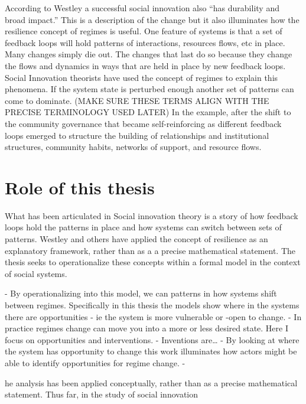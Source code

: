 According to Westley a successful social innovation also “has durability and broad impact.” This is a description of the change but it also illuminates how the resilience concept of regimes is useful. One feature of systems is that a set of feedback loops will hold patterns of interactions, resources flows, etc in place. Many changes simply die out.  The changes that last do so because they change the flows and dynamics in ways that are held in place by new feedback loops.  Social Innovation theorists have used the concept of regimes to explain this phenomena. If the system state is perturbed enough another set of patterns can come to dominate.  (MAKE SURE THESE TERMS ALIGN WITH THE PRECISE TERMINOLOGY USED LATER) In the example, after the shift to the community governance that became self-reinforcing as different feedback loops emerged to structure the building of relationships and institutional structures, community habits, networks of support, and resource flows. 

\section{Role of this thesis}

What has been articulated in Social innovation theory is a story of how feedback loops hold the patterns in place  and how systems can switch between sets of patterns. Westley and others have applied the concept of resilience as an explanatory framework, rather than as a a precise mathematical statement. 
The thesis seeks to operationalize these concepts within a formal model in the context of social systems. 


- By operationalizing into this model, we can patterns in how systems shift between regimes. Specifically in this thesis the models show where in the systems there are opportunities - ie the system is more vulnerable or -open to change. 
- In practice regimes change can move you into a more or less desired state. Here I focus on opportunities and interventions. 
- Inventions are…
- By looking at where the system has opportunity to change this work illuminates how actors might be able to identify opportunities for regime change. 
- 











he analysis has been applied conceptually, rather than as a precise mathematical statement. Thus far, in the study of social innovation 

